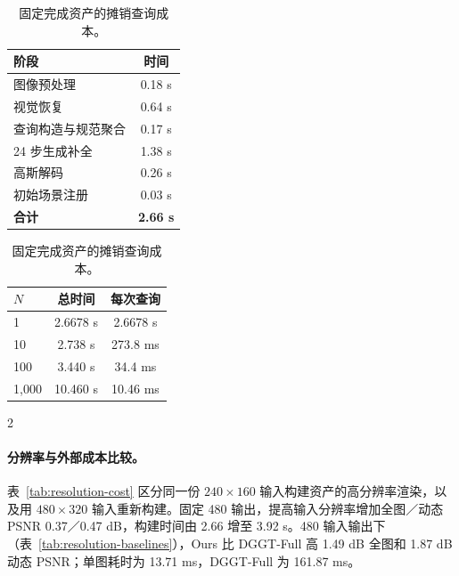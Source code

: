 \begin{table}[H]
\begin{minipage}[t]{0.48\textwidth}
\centering\small
\setlength{\tabcolsep}{4pt}
\caption{构建时间分解。}
\label{tab:timing-stages}
\begin{tabular}{@{}lc@{}}
\toprule
阶段 & 时间 \\
\midrule
图像预处理 & 0.18 s \\
视觉恢复 & 0.64 s \\
查询构造与规范聚合 & 0.17 s \\
24 步生成补全 & 1.38 s \\
高斯解码 & 0.26 s \\
初始场景注册 & 0.03 s \\
\textbf{合计} & \textbf{2.66 s} \\
\bottomrule
\end{tabular}
\end{minipage}\hfill
\begin{minipage}[t]{0.48\textwidth}
\centering\small
\setlength{\tabcolsep}{4pt}
\caption{固定完成资产的摊销查询成本。}
\label{tab:reuse-time}
\begin{tabular}{@{}lcc@{}}
\toprule
$N$ & 总时间 & 每次查询 \\
\midrule
1 & 2.6678 s & 2.6678 s \\
10 & 2.738 s & 273.8 ms \\
100 & 3.440 s & 34.4 ms \\
1,000 & 10.460 s & 10.46 ms \\
\bottomrule
\end{tabular}
\end{minipage}
\end{table}
\begin{multicols}{2}

\paragraph{分辨率与外部成本比较。}
表~\ref{tab:resolution-cost} 区分同一份 $240\times160$ 输入构建资产的高分辨率渲染，以及用 $480\times320$ 输入重新构建。固定 480 输出，提高输入分辨率增加全图／动态 PSNR 0.37／0.47 dB，构建时间由 2.66 增至 3.92 s。480 输入输出下（表~\ref{tab:resolution-baselines}），Ours 比 DGGT-Full 高 1.49 dB 全图和 1.87 dB 动态 PSNR；单图耗时为 13.71 ms，DGGT-Full 为 161.87 ms。

\end{multicols}
